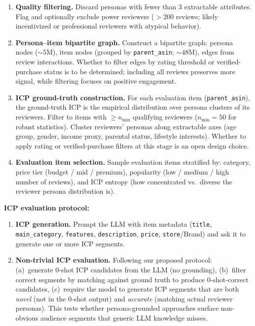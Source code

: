 \begin{enumerate}
\begin{itemize}
        \item \emph{Price distribution}: the price range of reviewed items serves as an income proxy.
    \end{itemize}
    Convert to structured persona format (demographics, interests, behavioral markers) using the ZIP-style extraction pipeline. Target: ${\sim}5$M high-quality personas with $\geq 3$ extractable attributes.
    \item \textbf{Quality filtering.} Discard personas with fewer than 3 extractable attributes. Flag and optionally exclude power reviewers ($> 200$ reviews; likely incentivized or professional reviewers with atypical behavior).
    \item \textbf{Persona--item bipartite graph.} Construct a bipartite graph: persona nodes (${\sim}5$M), item nodes (grouped by \texttt{parent\_asin}; ${\sim}48$M), edges from review interactions. Whether to filter edges by rating threshold or verified-purchase status is to be determined; including all reviews preserves more signal, while filtering focuses on positive engagement.
    \item \textbf{ICP ground-truth construction.} For each evaluation item (\texttt{parent\_asin}), the ground-truth ICP is the empirical distribution over persona clusters of its reviewers. Filter to items with $\geq n_{\min}$ qualifying reviewers ($n_{\min} = 50$ for robust statistics). Cluster reviewers' personas along extractable axes (age group, gender, income proxy, parental status, lifestyle interests). Whether to apply rating or verified-purchase filters at this stage is an open design choice.
    \item \textbf{Evaluation item selection.} Sample evaluation items stratified by: category, price tier (budget / mid / premium), popularity (low / medium / high number of reviews), and ICP entropy (how concentrated vs.\ diverse the reviewer persona distribution is).
\end{enumerate}

\medskip\noindent\textbf{ICP evaluation protocol:}
\begin{enumerate}
    \item \textbf{ICP generation.} Prompt the LLM with item metadata (\texttt{title}, \texttt{main\_category}, \texttt{features}, \texttt{description}, \texttt{price}, \texttt{store}/Brand) and ask it to generate one or more ICP segments.
    \item \textbf{Non-trivial ICP evaluation.} Following our proposed protocol: (a)~generate 0-shot ICP candidates from the LLM (no grounding), (b)~filter correct segments by matching against ground truth to produce 0-shot-correct candidates, (c)~require the model to generate ICP segments that are both \emph{novel} (not in the 0-shot output) and \emph{accurate} (matching actual reviewer personas). This tests whether persona-grounded approaches surface non-obvious audience segments that generic LLM knowledge misses.
\end{enumerate}

